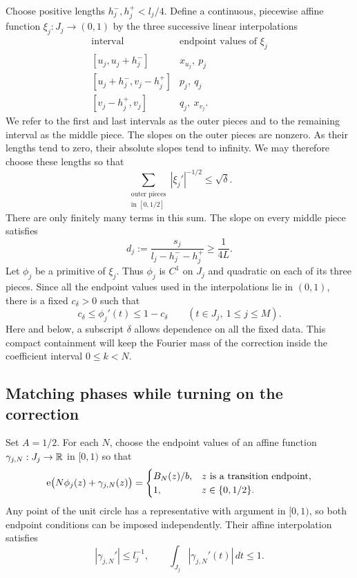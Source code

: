 Choose positive lengths $h_j^-,h_j^+<l_j/4$.  Define a continuous,
piecewise affine function $\xi_j:J_j\to(0,1)$ by the three successive
linear interpolations
\[
\begin{array}{c|c}
\text{interval}&\text{endpoint values of }\xi_j\\ \hline
[u_j,u_j+h_j^-]&x_{u_j},\ p_j\\[2pt]
[u_j+h_j^-,v_j-h_j^+]&p_j,\ q_j\\[2pt]
[v_j-h_j^+,v_j]&q_j,\ x_{v_j}.
\end{array}
\]
We refer to the first and last intervals as the outer pieces and to the
remaining interval as the middle piece.  The slopes on the outer pieces
are nonzero.  As their lengths tend to zero, their absolute slopes tend
to infinity.  We may therefore choose these lengths so that
\begin{equation}\label{eq:outer-slope-budget}
 \sum_{\substack{\text{outer pieces}\\\text{in }[0,1/2]}}
       |\xi_j'|^{-1/2}\le\sqrt\delta.
\end{equation}
There are only finitely many terms in this sum.  The slope on every middle
piece satisfies
\begin{equation}\label{eq:middle-slope}
 d_j:=\frac{s_j}{l_j-h_j^--h_j^+}\ge\frac1{4L}.
\end{equation}
Let $\phi_j$ be a primitive of $\xi_j$.  Thus $\phi_j$ is $C^1$ on $J_j$
and quadratic on each of its three pieces.  Since all the endpoint values
used in the interpolations lie in $(0,1)$, there is a fixed
$c_\delta>0$ such that
\begin{equation}\label{eq:derivative-interior}
 c_\delta\le\phi_j'(t)\le1-c_\delta
       \qquad(t\in J_j,\ 1\le j\le M).
\end{equation}
Here and below, a subscript $\delta$ allows dependence on all the fixed
data.  This compact containment will keep the Fourier mass of the
correction inside the coefficient interval $0\le k<N$.

\subsection{Matching phases while turning on the correction}

Set $A=1/2$.  For each $N$, choose the endpoint values of an affine function
$\gamma_{j,N}:J_j\to\mathbb R$ in $[0,1)$ so that
\begin{equation}\label{eq:endpoint-phase-match}
 \mathrm e\bigl(N\phi_j(z)+\gamma_{j,N}(z)\bigr)=
 \begin{cases}
   B_N(z)/b,&z\text{ is a transition endpoint},\\
   1,&z\in\{0,1/2\}.
 \end{cases}
\end{equation}
Any point of the unit circle has a representative with argument in
$[0,1)$, so both endpoint conditions can be imposed independently.  Their
affine interpolation satisfies
\begin{equation}\label{eq:gamma-bounds}
 |\gamma_{j,N}'|\le l_j^{-1},
 \qquad \int_{J_j}|\gamma_{j,N}'(t)|\,dt\le1.
\end{equation}

